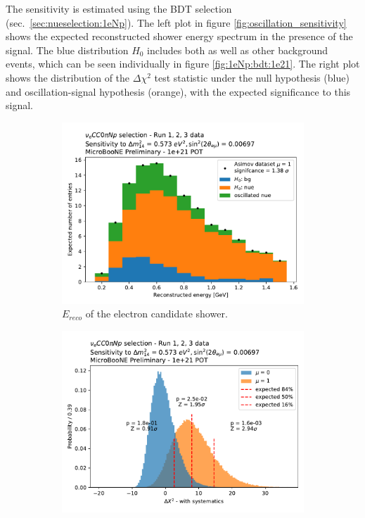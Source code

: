 The sensitivity is estimated using the \nueccnopinp BDT selection (sec.~\ref{sec:nueselection:1eNp}). 
The left plot in figure \ref{fig:oscillation_sensitivity} shows the expected reconstructed shower energy spectrum in the presence of the signal. The blue distribution $H_0$ includes both \nue as well as other background events, which can be seen individually in figure \ref{fig:1eNp:bdt:1e21}.
The right plot shows the distribution of the $\Delta \chi^2$ test statistic under the null hypothesis (blue) and oscillation-signal hypothesis (orange), with the expected significance to this signal.

\begin{figure}[H] 
\begin{center}
    \begin{subfigure}[b]{0.45\textwidth}
    \centering
    \includegraphics[width=1.00\textwidth]{Sensitivity/oscillation/asimov_nueccpinp_deltam2_0573_sin2theta2_000697.pdf}
    \caption{$E_{reco}$ of the electron candidate shower.}
    \end{subfigure}
    \begin{subfigure}[b]{0.45\textwidth}
    \centering
    \includegraphics[width=1.00\textwidth]{Sensitivity/oscillation/test_stat_nueccpinp_deltam2_0573_sin2theta2_000697.pdf}

\end{subfigure}
\end{center}
\end{figure}
